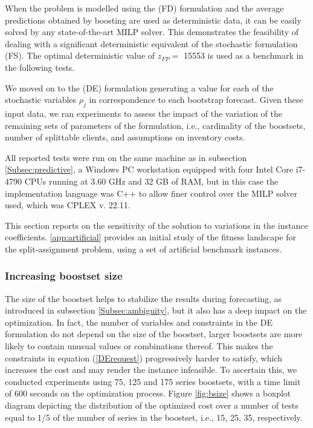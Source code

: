 \documentclass[poms,final,nonblindrev]{poms1_V1} %
\begin{document}
When the problem is modelled using the (FD) formulation and the average predictions obtained by boosting are used as deterministic data, it can be easily solved by any state-of-the-art MILP solver. This demonstrates the feasibility of dealing with a significant deterministic equivalent of the stochastic formulation (FS). The optimal deterministic value of $z_{FP} =$ 15553 is used as a benchmark in the following tests.

We moved on to the (DE) formulation generating a value for each of the stochastic variables $\rho_j$ in correspondence to each bootstrap forecast.
Given these input data, we ran experiments to assess the impact of the variation of the remaining sets of parameters of the formulation, i.e., cardinality of the boostsets, number of splittable clients, and assumptions on inventory costs. 

All reported tests were run on the same machine as in subsection \ref{Subsec:predictive}, a Windows PC workstation equipped with four Intel Core i7-4790 CPUs running at 3.60 GHz and 32 GB of RAM, but in this case the implementation language was C++ to allow finer control over the MILP solver used, which was CPLEX v. 22.11.

This section reports on the sensitivity of the solution to variations in the instance coefficients. \ref{app:artificial} provides an initial study of the fitness landscape for the split-assignment problem, using a set of artificial benchmark instances.

\subsubsection*{Increasing boostset size}

The size of the boostset helps to stabilize the results during forecasting, as introduced in subsection \ref{Subsec:ambiguity}, but it also has a deep impact on the optimization. In fact, the number of variables and constraints in the DE formulation do not depend on the size of the boostset, larger boostsets are more likely to contain unusual values or combinations thereof. This makes the constraints in equation (\ref{DErequest}) progressively harder to satisfy, which increases the cost and may render the instance infeasible.
To ascertain this, we conducted experiments using 75, 125 and 175 series boostsets, with a time limit of 600 seconds on the optimization process. Figure \ref{fig:bsize} shows a boxplot diagram depicting the distribution of the optimized cost over a number of tests equal to 1/5 of the number of series in the boostset, i.e., 15, 25, 35, respectively.
\end{document}
